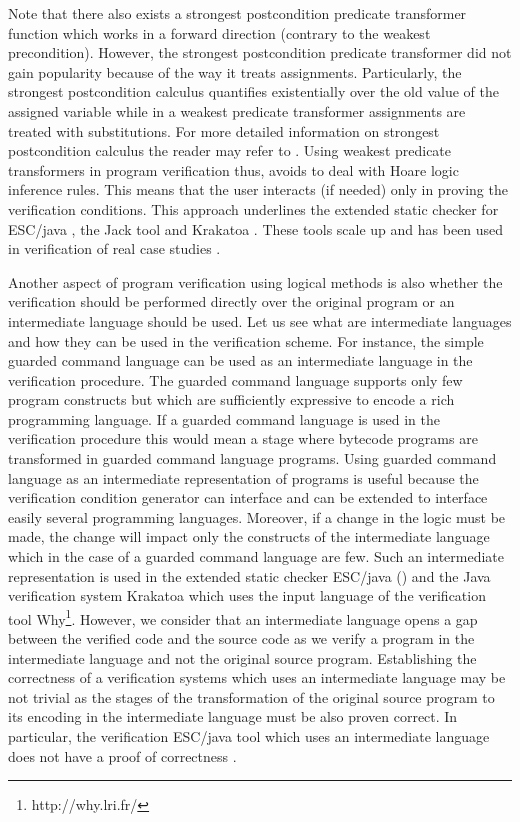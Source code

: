  Note that there also exists a strongest postcondition predicate transformer function which works in a forward direction 
 (contrary to the weakest precondition). However, the strongest postcondition predicate transformer
 did not gain popularity because of  the way it treats assignments. Particularly, the strongest postcondition calculus
 quantifies  existentially over the old value
 of the assigned variable while in a weakest predicate transformer assignments are treated with  substitutions.
For more detailed information on strongest postcondition calculus the reader may refer to  \cite{WPCDS}.
Using weakest predicate transformers in program verification thus, avoids to deal with Hoare logic inference rules. 
 This means that the user
 interacts (if needed) only in proving the verification conditions. 
This approach underlines the extended static checker for ESC/java \cite{escjava}, 
 the Jack tool \cite{BRL-JACK} and Krakatoa \cite{marche03krakatoa}. 
These tools scale up and has been used in verification of real case studies \cite{HuismanJB01,BBCGHLPR06:FMCO,jacobs04amast}.

Another aspect of program verification using logical methods is also whether the verification should be performed directly over the original program
or  an intermediate language should be used. Let us see what are intermediate languages and how they can be used in the verification scheme.
For instance, the simple guarded command language can be used as an intermediate language in the verification procedure.
 The guarded command   language supports  only few program constructs but which are 
sufficiently expressive to encode a rich programming language. 
If a guarded command language is used in the verification procedure this would mean 
a stage where  bytecode programs are transformed in guarded command language programs.
Using guarded command language as an intermediate representation of programs
is useful because the verification condition generator can interface and can be extended to interface 
easily several programming languages. Moreover, if a change in the logic must be made, the change will impact only
 the constructs of the intermediate language which in the case of a guarded command language are few.
Such an intermediate representation is used in the extended static checker
ESC/java (\cite{escjava}) and the Java verification system Krakatoa \cite{marche03krakatoa} which uses the input language of the verification tool Why\footnote{http://why.lri.fr/}.
However, we consider that an intermediate language 
opens a gap between  the verified code and the source code as we verify  a program in the intermediate language and not the original source program.
Establishing the correctness of a verification systems which uses an intermediate language
may be not trivial as the stages of the transformation of the original source program to its encoding in the intermediate language must be also proven correct. 
In particular, the verification ESC/java tool which uses an intermediate language does not have a proof of correctness \cite{FLL02ESC}.

